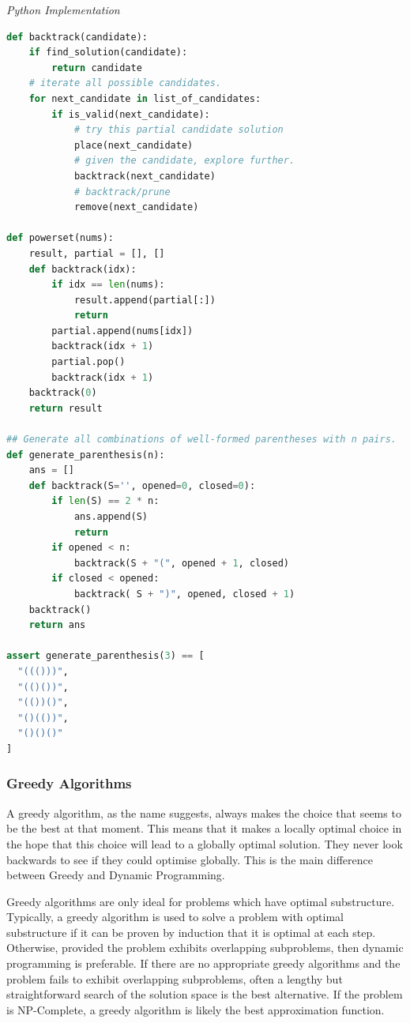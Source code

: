 \documentclass{article}
\begin{document}
\vspace{8pt} \emph{Python Implementation}
\begin{lstlisting}[language=Python]
def backtrack(candidate):
    if find_solution(candidate):
        return candidate
    # iterate all possible candidates.
    for next_candidate in list_of_candidates:
        if is_valid(next_candidate):
            # try this partial candidate solution
            place(next_candidate)
            # given the candidate, explore further.
            backtrack(next_candidate)
            # backtrack/prune
            remove(next_candidate)

def powerset(nums):
    result, partial = [], []
    def backtrack(idx):
        if idx == len(nums):
            result.append(partial[:])
            return
        partial.append(nums[idx])
        backtrack(idx + 1)
        partial.pop()
        backtrack(idx + 1)
    backtrack(0)
    return result
    
## Generate all combinations of well-formed parentheses with n pairs.
def generate_parenthesis(n):
    ans = []
    def backtrack(S='', opened=0, closed=0):
        if len(S) == 2 * n:
            ans.append(S)
            return
        if opened < n:
            backtrack(S + "(", opened + 1, closed)
        if closed < opened:
            backtrack( S + ")", opened, closed + 1)
    backtrack()    
    return ans
    
assert generate_parenthesis(3) == [
  "((()))",
  "(()())",
  "(())()",
  "()(())",
  "()()()"
]
\end{lstlisting}
    
    \subsubsection{Greedy Algorithms}
    A greedy algorithm, as the name suggests, always makes the choice that seems to be the best at that moment. This means that it makes a locally optimal choice in the hope that this choice will lead to a globally optimal solution. They never look backwards to see if they could optimise globally. This is the main difference between Greedy and Dynamic Programming.

    Greedy algorithms are only ideal for problems which have optimal substructure. Typically, a greedy algorithm is used to solve a problem with optimal substructure if it can be proven by induction that it is optimal at each step. Otherwise, provided the problem exhibits overlapping subproblems, then dynamic programming is preferable. If there are no appropriate greedy algorithms and the problem fails to exhibit overlapping subproblems, often a lengthy but straightforward search of the solution space is the best alternative. If the problem is NP-Complete, a greedy algorithm is likely the best approximation function.
    
\end{document}

